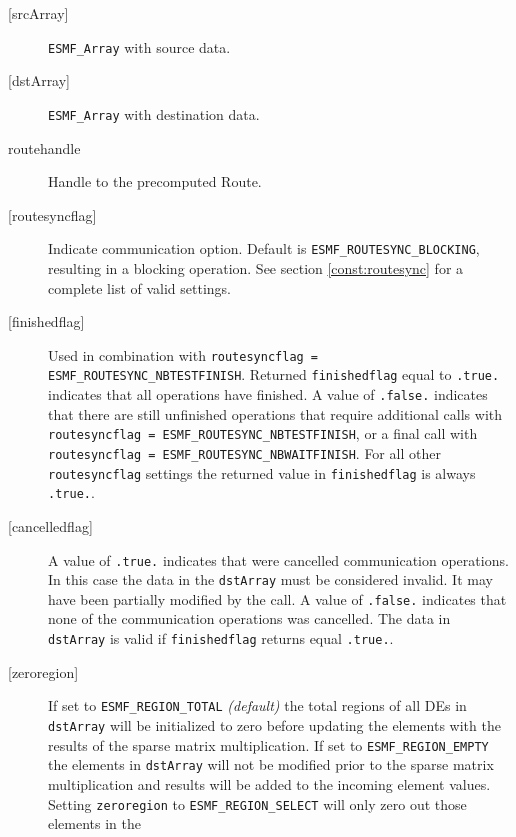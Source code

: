      \begin{description}
     \item [{[srcArray]}]
       {\tt ESMF\_Array} with source data.
     \item [{[dstArray]}]
       {\tt ESMF\_Array} with destination data.
     \item [routehandle]
       Handle to the precomputed Route.
     \item [{[routesyncflag]}]
       Indicate communication option. Default is {\tt ESMF\_ROUTESYNC\_BLOCKING},
       resulting in a blocking operation.
       See section \ref{const:routesync} for a complete list of valid settings.
     \item [{[finishedflag]}]
       \begin{sloppypar}
       Used in combination with {\tt routesyncflag = ESMF\_ROUTESYNC\_NBTESTFINISH}.
       Returned {\tt finishedflag} equal to {\tt .true.} indicates that all
       operations have finished. A value of {\tt .false.} indicates that there
       are still unfinished operations that require additional calls with
       {\tt routesyncflag = ESMF\_ROUTESYNC\_NBTESTFINISH}, or a final call with
       {\tt routesyncflag = ESMF\_ROUTESYNC\_NBWAITFINISH}. For all other {\tt routesyncflag}
       settings the returned value in {\tt finishedflag} is always {\tt .true.}.
       \end{sloppypar}
     \item [{[cancelledflag]}]
       A value of {\tt .true.} indicates that were cancelled communication
       operations. In this case the data in the {\tt dstArray} must be considered
       invalid. It may have been partially modified by the call. A value of
       {\tt .false.} indicates that none of the communication operations was
       cancelled. The data in {\tt dstArray} is valid if {\tt finishedflag} 
       returns equal {\tt .true.}.
     \item [{[zeroregion]}]
       \begin{sloppypar}
       If set to {\tt ESMF\_REGION\_TOTAL} {\em (default)} the total regions of
       all DEs in {\tt dstArray} will be initialized to zero before updating the 
       elements with the results of the sparse matrix multiplication. If set to
       {\tt ESMF\_REGION\_EMPTY} the elements in {\tt dstArray} will not be
       modified prior to the sparse matrix multiplication and results will be
       added to the incoming element values. Setting {\tt zeroregion} to 
       {\tt ESMF\_REGION\_SELECT} will only zero out those elements in the 

\end{sloppypar}
\end{description}
